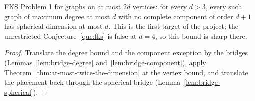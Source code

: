 \begin{theorem}
  \label{thm:bounded-target}
  \leanok
  FKS Problem 1 for graphs on at most $2d$ vertices: for every $d > 3$, every such graph
  of maximum degree at most $d$ with no complete component of order $d + 1$ has spherical
  dimension at most $d$. This is the first target of the project; the unrestricted
  Conjecture~\ref{que:fks} is false at $d = 4$, so this bound is sharp there.
\end{theorem}
\begin{proof}
  Translate the degree bound and the component exception by the bridges
  (Lemmas~\ref{lem:bridge-degree} and~\ref{lem:bridge-component}), apply
  Theorem~\ref{thm:at-most-twice-the-dimension} at the vertex bound, and translate the
  placement back through the spherical bridge (Lemma~\ref{lem:bridge-spherical}).
\end{proof}
